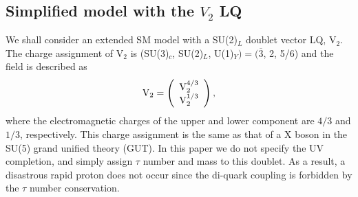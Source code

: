 \documentclass[12pt, a4paper]{article}
\numberwithin{equation}{section} %
\newcommand{\ov}{\overline}
\newcommand{\1}{\mbox{1}\hspace{-0.25em}\mbox{l}}
\begin{document}
\subsection{Simplified model with the $V_2$ LQ}
\label{sec:V2model}
We shall consider an extended SM model with a SU(2)$_L$ doublet vector LQ, $\text{V}_2$.
The charge assignment of $\text{V}_2$ is (SU(3)$_c$, SU(2)$_L$, U(1)$_Y)=(\ov{3}$, 2, 5/6) and the field is described as 
\begin{eqnarray}
  \rm{V}_2 =\left(
  \begin{array}{c}
    \rm{V}_2^{4/3}\\
    \rm{V}_2^{1/3}
  \end{array}
  \right),
\label{eq:V2doublet}
\end{eqnarray}
where the electromagnetic charges of the upper and lower component are $4/3$ and $1/3$, respectively. 
This charge assignment is the same as that of a X boson in the SU(5) grand unified theory (GUT).
In this paper we do not specify the UV completion, and simply assign $\tau$ number and mass to this doublet.
As a result, a disastrous rapid proton does not occur since the di-quark coupling is forbidden by the $\tau$ number conservation.
\end{document}
